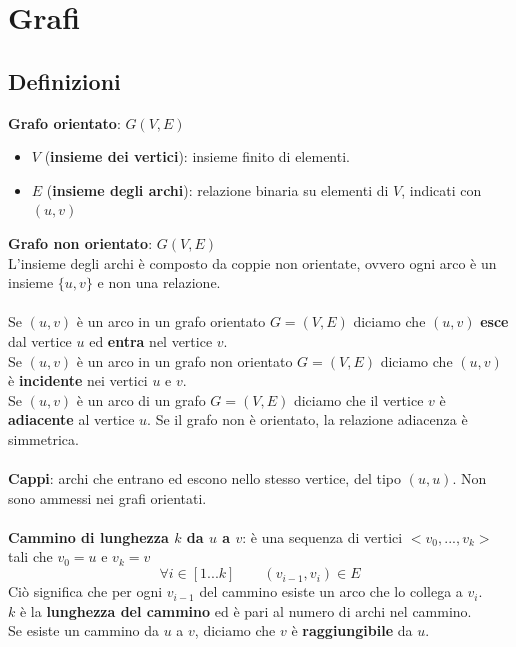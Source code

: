 \chapter{Grafi}

\section{Definizioni}
\textbf{Grafo orientato}: $G(V, E)$
    \begin{itemize}
        \item{$V$ (\textbf{insieme dei vertici}): insieme finito di elementi.}
        \item{$E$ (\textbf{insieme degli archi}): relazione binaria su elementi di $V$, indicati con $(u,v)$}
    \end{itemize}
\textbf{Grafo non orientato}: $G(V, E)$\\
L'insieme degli archi è composto da coppie non orientate, ovvero ogni arco è un insieme $\{u, v\}$ e non una relazione.\\\\
Se $(u,v)$ è un arco in un grafo orientato $G = (V, E)$ diciamo che $(u,v)$ \textbf{esce} dal vertice $u$ ed \textbf{entra} nel vertice $v$.\\
Se $(u,v)$ è un arco in un grafo non orientato $G = (V, E)$ diciamo che $(u,v)$ è \textbf{incidente} nei vertici $u$ e $v$.\\
Se $(u,v)$ è un arco di un grafo $G = (V, E)$ diciamo che il vertice $v$ è \textbf{adiacente} al vertice $u$. Se il grafo non è orientato, la relazione adiacenza è simmetrica.\\\\
\textbf{Cappi}: archi che entrano ed escono nello stesso vertice, del tipo $(u,u)$. Non sono ammessi nei grafi orientati.\\\\
\textbf{Cammino di lunghezza $k$ da $u$ a $v$}: è una sequenza di vertici $<v_0, ..., v_k>$ tali che $v_0 = u$ e $v_k = v$
    \begin{equation}
        \forall i \in [1...k]   \qquad (v_{i-1}, v_i) \in E
    \end{equation}
Ciò significa che per ogni $v_{i-1}$ del cammino esiste un arco che lo collega a $v_i$.\\
$k$ è la \textbf{lunghezza del cammino} ed è pari al numero di archi nel cammino.\\ 
Se esiste un cammino da $u$ a $v$, diciamo che $v$ è \textbf{raggiungibile} da $u$.\\
